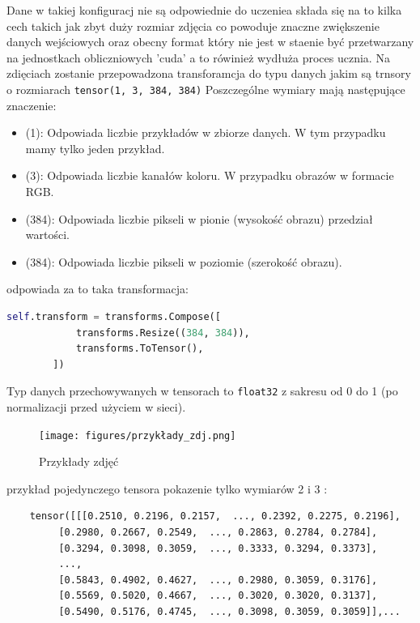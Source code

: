 \documentclass[12pt,twoside]{article}
\begin{document}
Dane w takiej konfiguracj nie są odpowiednie do uczeniea składa się na to kilka cech takich jak zbyt duży rozmiar zdjęcia co powoduje  znaczne zwiększenie danych wejściowych oraz obecny format który nie jest w staenie być przetwarzany na jednostkach obliczniowych 'cuda' a to rówinież wydłuża proces ucznia.
Na zdięciach zostanie przepowadzona transforamcja do typu danych jakim są trnsory o rozmiarach \texttt{tensor(1, 3, 384, 384)} 
Poszczególne wymiary mają następujące znaczenie:
\begin{itemize}
	\item (1): Odpowiada liczbie przykładów w zbiorze danych. W tym przypadku mamy tylko jeden przykład.
	\item (3): Odpowiada liczbie kanałów koloru. W przypadku obrazów w formacie RGB.
	\item  (384): Odpowiada liczbie pikseli w pionie (wysokość obrazu) przedział wartości.
	\item (384): Odpowiada liczbie pikseli w poziomie (szerokość obrazu).

\end{itemize}
odpowiada za to taka transformacja: 

\begin{lstlisting}[language=Python,caption=Transforamcja zdjęć,label={kod_Transformacja}]
	self.transform = transforms.Compose([
            transforms.Resize((384, 384)),
            transforms.ToTensor(),
        ])
\end{lstlisting}

Typ danych przechowywanych w tensorach to \texttt{float32} z sakresu od 0 do 1 (po normalizacji przed użyciem w sieci).


\begin{figure}[b]
	\centering
	\texttt{[image: figures/przykłady\_zdj.png]}
	\caption{Przykłady zdjęć}
	\label{fig:dane}
  \end{figure}

przykład pojedynczego tensora pokazenie tylko wymiarów 2 i 3 : 

  \begin{verbatim}
	tensor([[[0.2510, 0.2196, 0.2157,  ..., 0.2392, 0.2275, 0.2196],
         [0.2980, 0.2667, 0.2549,  ..., 0.2863, 0.2784, 0.2784],
         [0.3294, 0.3098, 0.3059,  ..., 0.3333, 0.3294, 0.3373],
         ...,
         [0.5843, 0.4902, 0.4627,  ..., 0.2980, 0.3059, 0.3176],
         [0.5569, 0.5020, 0.4667,  ..., 0.3020, 0.3020, 0.3137],
         [0.5490, 0.5176, 0.4745,  ..., 0.3098, 0.3059, 0.3059]],...

\end{verbatim}
\end{document}
